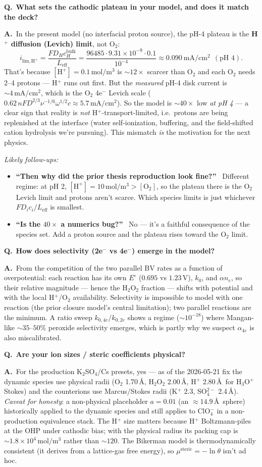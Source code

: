 \documentclass[11pt]{article}
\newcommand{\Eeq}{E^{\circ}}
\newcommand{\Leff}{L_{\mathrm{eff}}}
\newcommand{\bulk}{\mathrm{bulk}}
\newcommand{\Q}[1]{\medskip\par\noindent\textcolor{qcol}{\textbf{Q.}}\ \textbf{#1}\par\nopagebreak\smallskip}
\newcommand{\A}{\noindent\textbf{A.}\ \ignorespaces}
\newenvironment{followups}{\par\smallskip\noindent\emph{Likely follow-ups:}\begin{itemize}[leftmargin=1.6em,topsep=1pt]}{\end{itemize}}
\newcommand{\fu}[1]{\item \textbf{``#1''}\ }
\begin{document}
\Q{What sets the cathodic plateau in your model, and does it match the
deck?}
\A In the present model (no interfacial proton source), the pH-4 plateau is
the \textbf{H$^+$ diffusion (Levich) limit}, not O$_2$:
\[
  i_{\mathrm{lim,H^+}}=\frac{F D_{H}c_{H}^{\bulk}}{\Leff}
  =\frac{96485\cdot9.31\times10^{-9}\cdot0.1}{10^{-4}}
  \approx0.090~\mathrm{mA/cm^2}\ \ (\text{pH 4}).
\]
That's because $[\mathrm{H^+}]=0.1\,\mathrm{mol/m^3}$ is $\sim12\times$
scarcer than O$_2$ and each O$_2$ needs 2--4 protons --- H$^+$ runs out
first. But the \emph{measured} pH-4 disk current is $\sim4\,\mathrm{mA/cm^2}$,
which is the O$_2$ 4e$^-$ Levich scale ($0.62\,nFD^{2/3}\nu^{-1/6}\omega^{1/2}
c\approx5.7\,\mathrm{mA/cm^2}$). So the model is $\sim40\times$ low \emph{at
pH 4} --- a clear sign that reality is \emph{not} H$^+$-transport-limited,
i.e.\ protons are being replenished at the interface (water self-ionization,
buffering, and the field-shifted cation hydrolysis we're pursuing). This
mismatch \emph{is} the motivation for the next physics.
\begin{followups}
\fu{Then why did the prior thesis reproduction look fine?} Different regime:
at pH 2, $[\mathrm{H^+}]=10\,\mathrm{mol/m^3}\!>\![\mathrm{O_2}]$, so the
plateau there is the O$_2$ Levich limit and protons aren't scarce. Which
species limits is just whichever $FD_ic_i/\Leff$ is smallest.
\fu{Is the $40\times$ a numerics bug?} No --- it's a faithful consequence of
the species set. Add a proton source and the plateau rises toward the O$_2$
limit.
\end{followups}

\Q{How does selectivity (2e$^-$ vs 4e$^-$) emerge in the model?}
\A From the competition of the two parallel BV rates as a function of
overpotential: each reaction has its own $\Eeq$ ($0.695$ vs $1.23$\,V),
$k_0$, and $\alpha n_e$, so their relative magnitude --- hence the H$_2$O$_2$
fraction --- shifts with potential and with the local H$^+$/O$_2$
availability. Selectivity is impossible to model with one reaction (the prior
closure model's central limitation); two parallel reactions are the minimum.
A ratio sweep $k_{0,4e}/k_{0,2e}$ shows a regime
($\sim10^{-18}$) where Mangan-like $\sim35$--$50\%$ peroxide selectivity
emerges, which is partly why we suspect $\alpha_{4e}$ is also miscalibrated.

\Q{Are your ion sizes / steric coefficients physical?}
\A For the production K$_2$SO$_4$/Cs presets, yes --- as of the 2026-05-21
fix the dynamic species use physical radii (O$_2$ 1.70\,\AA, H$_2$O$_2$
2.00\,\AA, H$^+$ 2.80\,\AA\ for H$_3$O$^+$ Stokes) and the counterions use
Marcus/Stokes radii (K$^+$ 2.3, SO$_4^{2-}$ 2.4\,\AA). \emph{Caveat for
honesty}: a non-physical placeholder $a=0.01$ (an $\approx14.9$\,\AA\ sphere)
historically applied to the dynamic species and still applies to ClO$_4^-$
in a non-production equivalence stack. The H$^+$ size matters because H$^+$
Boltzmann-piles at the OHP under cathodic bias; with the physical radius its
packing cap is $\sim1.8\times10^4\,\mathrm{mol/m^3}$ rather than $\sim120$.
The Bikerman model is thermodynamically consistent (it derives from a
lattice-gas free energy), so $\mu^{\mathrm{steric}}=-\ln\theta$ isn't ad hoc.
\end{document}
